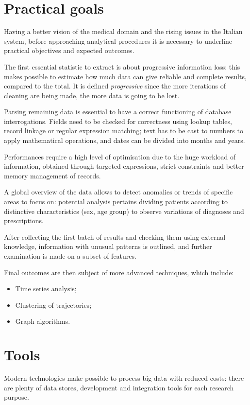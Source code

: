 \section{Practical goals}
Having a better vision of the medical domain and the rising issues in the Italian system, before approaching analytical procedures it is necessary to underline practical objectives and expected outcomes.

The first essential statistic to extract is about progressive information loss: this makes possible to estimate how much data can give reliable and complete results, compared to the total. It is defined \textit{progressive} since the more iterations of cleaning are being made, the more data is going to be lost. 

Parsing remaining data is essential to have a correct functioning of database interrogations. Fields need to be checked for correctness using lookup tables, record linkage or regular expression matching; text has to be cast to numbers to apply mathematical operations, and dates can be divided into months and years.

Performances require a high level of optimisation due to the huge workload of information, obtained through targeted expressions, strict constraints and better memory management of records. 

A global overview of the data allows to detect anomalies or trends of specific areas to focus on: potential analysis pertains dividing patients according to distinctive characteristics (sex, age group) to observe variations of diagnoses and prescriptions. 

After collecting the first batch of results and checking them using external knowledge, information with unusual patterns is outlined, and further examination is made on a subset of features.

Final outcomes are then subject of more advanced techniques, which include:
\begin{itemize}
	\item Time series analysis;
	\item Clustering of trajectories;
	\item Graph algorithms.
\end{itemize}

\section{Tools}
Modern technologies make possible to process big data with reduced costs: there are plenty of data stores, development and integration tools for each research purpose. 

